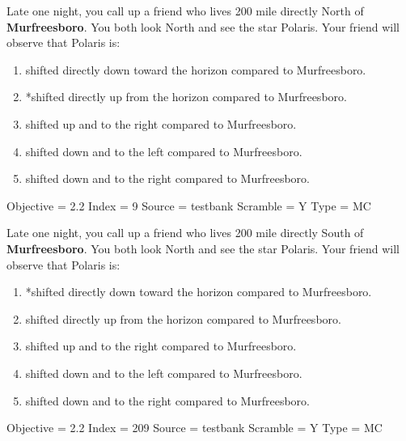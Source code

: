 \documentclass[11pt]{article}
\begin{document}
\begin{enumerate}
\begin{minipage}{\textwidth}
\begin{minipage}{\textwidth}
\item Late one night, you call up a friend who lives 200 mile directly North of {\bf Murfreesboro}.   You both look North and see the star Polaris.  Your friend will observe that Polaris is:
\begin{enumerate} 
\setlength{\itemsep}{1pt} 
\setlength{\parskip}{0pt} 
\setlength{\parsep}{0pt}
\setlength{\multicolsep}{1pt} 
\item shifted directly down toward the horizon compared to Murfreesboro.
\item *shifted directly up from the horizon compared to  Murfreesboro.
\item shifted up and to the right compared to Murfreesboro.
\item shifted down and to the left  compared to Murfreesboro.
\item shifted down and to the right compared to Murfreesboro.
\end{enumerate} 
Objective = 2.2
Index = 9
Source = testbank
Scramble = Y
Type = MC
\end{minipage}
\end{minipage}
\vskip 0.20in

\begin{minipage}{\textwidth}
\begin{minipage}{\textwidth}
\item Late one night, you call up a friend who lives 200 mile directly South of {\bf Murfreesboro}.   You both look North and see the star Polaris.  Your friend will observe that Polaris is:
\begin{enumerate} 
\setlength{\itemsep}{1pt} 
\setlength{\parskip}{0pt} 
\setlength{\parsep}{0pt}
\setlength{\multicolsep}{1pt} 
\item *shifted directly down toward the horizon compared to Murfreesboro.
\item shifted directly up from the horizon compared to  Murfreesboro.
\item shifted up and to the right compared to Murfreesboro.
\item shifted down and to the left  compared to Murfreesboro.
\item shifted down and to the right compared to Murfreesboro.
\end{enumerate} 
Objective = 2.2
Index = 209
Source = testbank
Scramble = Y
Type = MC
\end{minipage}
\end{minipage}
\vskip 0.20in


\end{enumerate}
\end{document}
